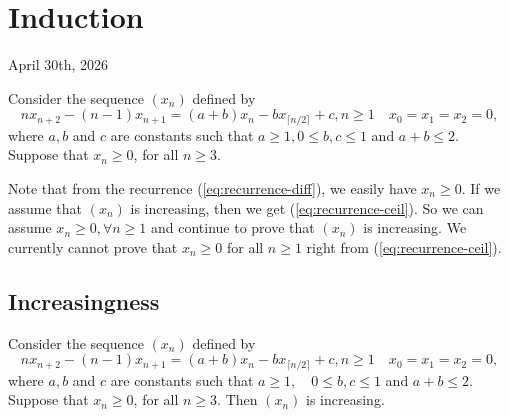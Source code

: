 \chapter{Induction}

\begin{center}
  April 30th, 2026
  \vspace{0.5cm}
\end{center}


Consider the sequence $(x_n)$ defined by
\begin{equation}
  \label{eq:recurrence-ceil}
  nx_{n+2} - (n-1)x_{n+1} = (a+b)x_n - b x_{\lceil n/2\rceil} + c, n\ge 1 \quad x_0 = x_1 = x_2 = 0,
\end{equation}
where $a,b$ and $c$ are constants such that $a\ge1, 0 \le b,c \le 1$ and $a+b\le 2$. Suppose that $x_n\ge 0$, for all $n\ge 3$.

Note that from the recurrence (\ref{eq:recurrence-diff}), we easily have $x_n\ge 0$. If we assume that $(x_n)$ is increasing, then we get (\ref{eq:recurrence-ceil}). So we can assume $x_n\ge 0,\forall n\ge 1$ and continue to prove that $(x_n)$ is increasing. We currently cannot prove that $x_n\ge 0$ for all $n\ge 1$ right from (\ref{eq:recurrence-ceil}).

\section{Increasingness}

\begin{proposition}
  \label{prop:recurrence-ceil}
  Consider the sequence $(x_n)$ defined by
  \begin{equation}
    nx_{n+2} - (n-1)x_{n+1} = (a+b)x_n - b x_{\lceil n/2\rceil} + c, n\ge 1 \quad x_0 = x_1 = x_2 = 0,
  \end{equation}
  where $a,b$ and $c$ are constants such that $a\ge1, \quad 0 \le b,c \le 1$ and $a+b\le 2$. Suppose that $x_n\ge 0$, for all $n\ge 3$. Then $(x_n)$ is increasing.
\end{proposition}


